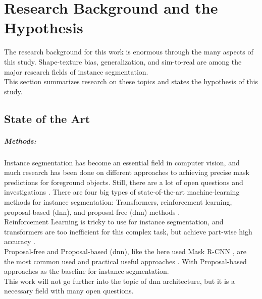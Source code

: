 
\chapter{Research Background and the Hypothesis}
\label{chap:kapitel2}

	The research background for this work is enormous through the many aspects of this study. Shape-texture bias, generalization, and sim-to-real are among the major research fields of instance segmentation.\\
	This section summarizes research on these topics and states the hypothesis of this study.

	\section{State of the Art}
	\label{sec:state-of-the-art}
		\paragraph{Methods:} Instance segmentation has become an essential field in computer vision, and much research has been done on different approaches to achieving precise mask predictions for foreground objects. Still, there are a lot of open questions and investigations \cite{Sharma2022}. There are four big types of state-of-the-art machine-learning methods for instance segmentation: Transformers, reinforcement learning, proposal-based (\ac{dnn}), and proposal-free (\ac{dnn}) methods \cite{Sharma2022}.\\
		Reinforcement Learning is tricky to use for instance segmentation, and transformers are too inefficient for this complex task, but achieve part-wise high accuracy \cite{Sharma2022}.\\
		Proposal-free and Proposal-based (\ac{dnn}), like the here used Mask R-CNN \cite{Kaiming2017}, are the most common used and practical useful approaches \cite{Sharma2022}. With Proposal-based approaches as the baseline for instance segmentation.\\
		This work will not go further into the topic of \ac{dnn} architecture, but it is a necessary field with many open questions.
